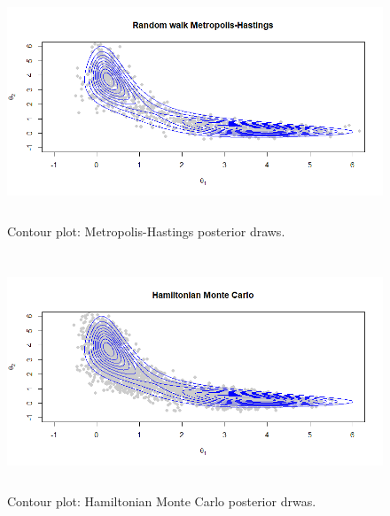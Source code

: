 \begin{enumerate}[leftmargin=*]
 
 \begin{figure}[!h]
 	\includegraphics[width=340pt, height=200pt]{Chapters/chapter5/figures/M-Hexample.png}
 	\caption[List of figure caption goes here]{Contour plot: Metropolis-Hastings posterior draws.}\label{fig54}
 \end{figure} 
 
 \begin{figure}[!h]
 	\includegraphics[width=340pt, height=200pt]{Chapters/chapter5/figures/HMCexample1.png}
 	\caption[List of figure caption goes here]{Contour plot: Hamiltonian Monte Carlo posterior drwas.}\label{fig55}
 \end{figure} 
 
  
  

\end{enumerate}